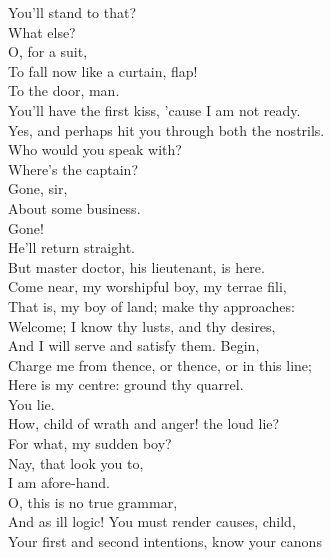 \documentclass{memoir}
\begin{document}
\begin{drama*}
 You'll stand to that?\\
\subtlespeaks {} What else?\\
\facespeaks {} O, for a suit,\\
 To fall now like a curtain, flap!\\
\subtlespeaks {} To the door, man.\\
\facespeaks  You'll have the first kiss, 'cause I am not ready.\\
\subtlespeaks  Yes, and perhaps hit you through both the nostrils.\\
\facespeaks {} Who would you speak with?\\
\kastrilspeaks {} Where's the captain?\\
\facespeaks {} Gone, sir,\\
 About some business.\\
\kastrilspeaks {} Gone!\\
\facespeaks {} He'll return straight.\\
 But master doctor, his lieutenant, is here.\\
\subtlespeaks  Come near, my worshipful boy, my terrae fili,\\
 That is, my boy of land; make thy approaches:\\
 Welcome; I know thy lusts, and thy desires,\\
 And I will serve and satisfy them. Begin,\\
 Charge me from thence, or thence, or in this line;\\
 Here is my centre: ground thy quarrel.\\
\kastrilspeaks {} You lie.\\
\subtlespeaks  How, child of wrath and anger! the loud lie?\\
 For what, my sudden boy?\\
\kastrilspeaks {} Nay, that look you to,\\
 I am afore-hand.\\
\subtlespeaks {} O, this is no true grammar,\\
 And as ill logic! You must render causes, child,\\
 Your first and second intentions, know your canons\\

\end{drama*}
\end{document}
